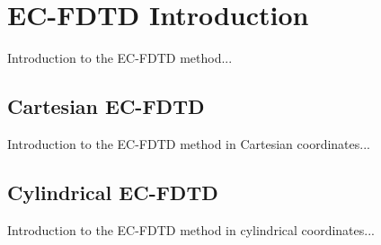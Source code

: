 \chapter{EC-FDTD Introduction}
Introduction to the EC-FDTD method...

\section{Cartesian EC-FDTD}
Introduction to the EC-FDTD method in Cartesian coordinates...

\section{Cylindrical EC-FDTD}
Introduction to the EC-FDTD method in cylindrical coordinates...


